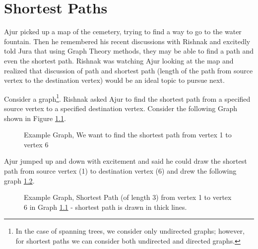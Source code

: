 \chapter{Shortest Paths}
Ajur picked up a map of the cemetery,  trying to find a way to go to the water fountain. Then he remembered his recent discussions with Rishnak and excitedly told Jura that using Graph Theory methods, they may be able to find a path and even the shortest path. Rishnak was watching Ajur looking at the map and realized that discussion of path and shortest path (length of the path from source vertex to the destination vertex) would be an ideal topic to pursue next.

Consider a graph\footnote{In the case of spanning trees, we consider only undirected graphs; however, for shortest paths we can consider both undirected and directed graphs.}. Rishnak asked Ajur to find the shortest path from a specified source vertex to a specified destination vertex. Consider the following Graph shown in Figure \ref{12g1}.
\begin{figure}
\begin{center}
\caption{ Example Graph, We want to find the shortest path from vertex 1 to vertex 6}\label{12g1}
\end{center}
\end{figure}

Ajur jumped up and down with excitement and said he could draw the shortest path from source vertex (1) to destination vertex (6) and drew the following graph \ref{12g2}.

\begin{figure}
\begin{center}
\caption{ Example Graph, Shortest Path (of length 3) from vertex 1 to vertex 6 in Graph \ref{12g1} - shortest path is drawn in thick lines.}\label{12g2}
\end{center}
\end{figure}

